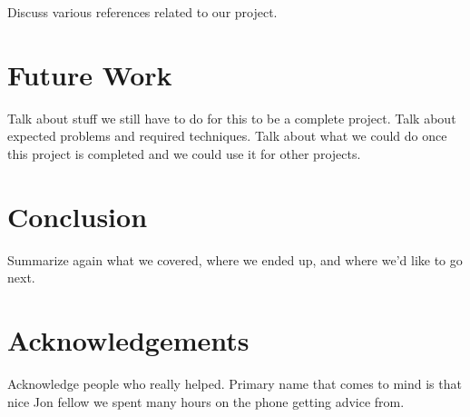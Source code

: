 \documentclass[a4paper,twocolumn]{article}
\begin{document}
Discuss various references related to our project.

\section{Future Work}

Talk about stuff we still have to do for this to be a complete project.  Talk
about expected problems and required techniques.  Talk about what we could do
once this project is completed and we could use it for other projects.

\section{Conclusion}

Summarize again what we covered, where we ended up, and where we'd like to go
next.

\section*{Acknowledgements}

Acknowledge people who really helped.  Primary name that comes to mind is that
nice Jon fellow we spent many hours on the phone getting advice from.



\end{document}
